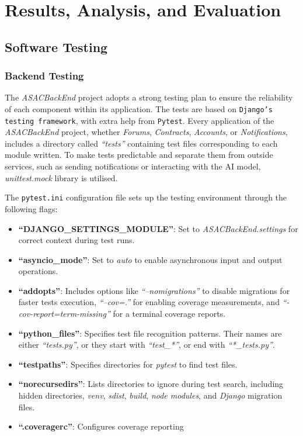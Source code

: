\chapter{Results, Analysis, and Evaluation}

\section{Software Testing}

\subsection{Backend Testing}

The \textit{ASACBackEnd} project adopts a strong testing plan to ensure the reliability of each component within its application. The tests are based on \texttt{Django's testing framework}, with extra help from \texttt{Pytest}. Every application of the \textit{ASACBackEnd} project, whether \textit{Forums}, \textit{Contracts}, \textit{Accounts}, or \textit{Notifications}, includes a directory called \textit{``tests''} containing test files corresponding to each module written. To make tests predictable and separate them from outside services, such as sending notifications or interacting with the AI model, \textit{unittest.mock} library is utilised.

The \texttt{pytest.ini} configuration file sets up the testing environment through the following flags:

\begin{itemize}
    \item \textbf{``DJANGO\_SETTINGS\_MODULE''}: Set to \textit{ASACBackEnd.settings} for correct context during test runs.
    \item \textbf{``asyncio\_mode''}: Set to \textit{auto} to enable asynchronous input and output operations.
    \item \textbf{``addopts''}: Includes options like \textit{``--nomigrations''} to disable migrations for faster tests execution, \textit{``--cov=.''} for enabling coverage measurements, and \textit{``-cov-report=term-missing''} for a terminal coverage reports.
    \item \textbf{``python\_files''}: Specifies test file recognition patterns. Their names are either \textit{``tests.py''}, or they start with \textit{``test\_*''}, or end with \textit{``*\_tests.py''}. 
    \item \textbf{``testpaths''}: Specifies directories for \textit{pytest} to find test files.
    \item \textbf{``norecursedirs''}: Lists directories to ignore during test search, including hidden directories, \textit{venv}, \textit{sdist}, \textit{build}, \textit{node modules}, and \textit{Django} migration files.
    \item \textbf{``.coveragerc''}: Configures coverage reporting
\end{itemize}

